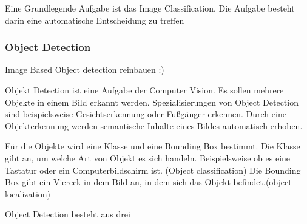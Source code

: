 Eine Grundlegende Aufgabe ist das Image Classification. Die Aufgabe besteht darin eine automatische Entscheidung zu treffen
%
%
%

%
%
%
%




\subsubsection{Object Detection}
Image Based Object detection reinbauen :)

Objekt Detection ist eine Aufgabe der Computer Vision. Es sollen mehrere Objekte in einem Bild erkannt werden. Spezialisierungen von Object Detection sind beispielsweise Gesichtserkennung oder Fußgänger erkennen. Durch eine Objekterkennung werden semantische Inhalte eines Bildes automatisch erhoben. 

Für die Objekte wird eine Klasse und eine Bounding Box bestimmt. 
Die Klasse gibt an, um welche Art von Objekt es sich handeln. Beispielsweise ob es eine Tastatur oder ein Computerbildschirm ist. (Object classification)
Die Bounding Box gibt ein Viereck in dem Bild an, in dem sich das Objekt befindet.(object localization)

Object Detection besteht aus drei 



